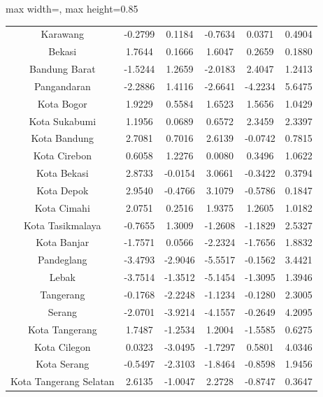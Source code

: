 \begin{table}[H]
\begin{adjustbox}{max width=\textwidth, max height=0.85\textheight}
\begin{tabular}{|c|c|c|c|c|c|}
Karawang & -0.2799 & 0.1184 & -0.7634 & 0.0371 & 0.4904 \\
Bekasi & 1.7644 & 0.1666 & 1.6047 & 0.2659 & 0.1880 \\
Bandung Barat & -1.5244 & 1.2659 & -2.0183 & 2.4047 & 1.2413 \\
Pangandaran & -2.2886 & 1.4116 & -2.6641 & -4.2234 & 5.6475 \\
Kota Bogor & 1.9229 & 0.5584 & 1.6523 & 1.5656 & 1.0429 \\
Kota Sukabumi & 1.1956 & 0.0689 & 0.6572 & 2.3459 & 2.3397 \\
Kota Bandung & 2.7081 & 0.7016 & 2.6139 & -0.0742 & 0.7815 \\
Kota Cirebon & 0.6058 & 1.2276 & 0.0080 & 0.3496 & 1.0622 \\
Kota Bekasi & 2.8733 & -0.0154 & 3.0661 & -0.3422 & 0.3794 \\
Kota Depok & 2.9540 & -0.4766 & 3.1079 & -0.5786 & 0.1847 \\
Kota Cimahi & 2.0751 & 0.2516 & 1.9375 & 1.2605 & 1.0182 \\
Kota Tasikmalaya & -0.7655 & 1.3009 & -1.2608 & -1.1829 & 2.5327 \\
Kota Banjar & -1.7571 & 0.0566 & -2.2324 & -1.7656 & 1.8832 \\
Pandeglang & -3.4793 & -2.9046 & -5.5517 & -0.1562 & 3.4421 \\
Lebak & -3.7514 & -1.3512 & -5.1454 & -1.3095 & 1.3946 \\
Tangerang & -0.1768 & -2.2248 & -1.1234 & -0.1280 & 2.3005 \\
Serang & -2.0701 & -3.9214 & -4.1557 & -0.2649 & 4.2095 \\
Kota Tangerang & 1.7487 & -1.2534 & 1.2004 & -1.5585 & 0.6275 \\
Kota Cilegon & 0.0323 & -3.0495 & -1.7297 & 0.5801 & 4.0346 \\
Kota Serang & -0.5497 & -2.3103 & -1.8464 & -0.8598 & 1.9456 \\
Kota Tangerang Selatan & 2.6135 & -1.0047 & 2.2728 & -0.8747 & 0.3647 \\
\hline
\end{tabular}
\end{adjustbox}
\end{table}